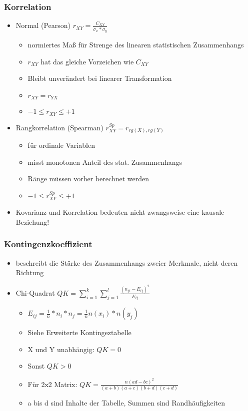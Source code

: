 \documentclass[a4paper]{article}
\begin{document}
\begin{landscape}
\begin{multicols}{4}
    \subsubsection*{Korrelation}
    \begin{itemize}[noitemsep,nolistsep,leftmargin=*]
        \item Normal (Pearson) $r_{XY} = \frac{C_{XY}}{\sigma_x * \sigma_y}$
        \begin{itemize}[noitemsep,nolistsep,leftmargin=*]
            \item normiertes Maß für Strenge des linearen statistischen Zusammenhangs
            \item $r_{XY}$ hat das gleiche Vorzeichen wie $C_{XY}$
            \item Bleibt unverändert bei linearer Transformation
            \item $r_{XY} = r_{YX}$
            \item $-1 \leq r_{XY} \leq +1$
        \end{itemize}
        \item Rangkorrelation (Spearman) $r_{XY}^{Sp} = r_{rg(X), rg(Y)}$
        \begin{itemize}[noitemsep,nolistsep,leftmargin=*]
            \item für ordinale Variablen
            \item misst monotonen Anteil des stat. Zusammenhangs
            \item Ränge müssen vorher berechnet werden
            \item $-1 \leq r_{XY}^{Sp} \leq +1$

        \end{itemize}
        \item Kovarianz und Korrelation bedeuten nicht zwangsweise eine kausale Beziehung!
    \end{itemize}

    \subsubsection*{Kontingenzkoeffizient}
    \begin{itemize}[noitemsep,nolistsep,leftmargin=*]
        \item beschreibt die Stärke des Zusammenhangs zweier Merkmale, nicht deren Richtung
        \item Chi-Quadrat $QK = \sum_{i=1}^{k}\sum_{j=1}^{l}\frac{(n_{ji}-E_{ij})^2}{E_{ij}}$
        \begin{itemize}[noitemsep,nolistsep,leftmargin=*]
            \item $E_{ij} = \frac{1}{n}*n_i*n_j = \frac{1}{n}n(x_i)*n(y_j)$
            \item Siehe Erweiterte Kontingeztabelle
            \item X und Y unabhängig: $QK = 0$
            \item Sonst $QK > 0$
            \item Für 2x2 Matrix: $QK = \frac{n(ad-bc)^2}{(a+b)(a+c)(b+d)(c+d)}$
            \item a bis d sind Inhalte der Tabelle, Summen sind Randhäufigkeiten
            

\end{itemize}
\end{itemize}
\end{multicols}
\end{landscape}
\end{document}
